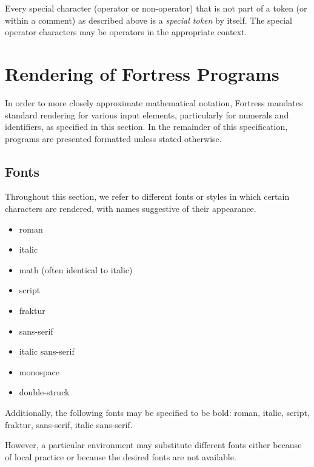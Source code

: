 Every special character (operator or non-operator)
that is not part of a token (or within a comment)
as described above
is a \emph{special token} by itself.
The special operator characters
may be operators in the appropriate context.

\section{Rendering of Fortress Programs}

In order to more closely approximate mathematical notation,
Fortress mandates standard rendering for various input elements,
particularly for numerals and identifiers,
as specified in this section.
In the remainder of this specification,
programs are presented formatted unless stated otherwise.


\subsection{Fonts}

Throughout this section,
we refer to different fonts or styles
in which certain characters are rendered,
with names suggestive of their appearance.
\begin{itemize}

\item
roman

\item
italic

\item
math (often identical to italic)

\item
script

\item
fraktur

\item
sans-serif

\item
italic sans-serif

\item
monospace

\item
double-struck

\end{itemize}

Additionally,
the following fonts may be specified to be bold:
roman, italic, script, fraktur, sans-serif, italic sans-serif.

However,
a particular environment may substitute different fonts
either because of local practice
or because the desired fonts are not available.


